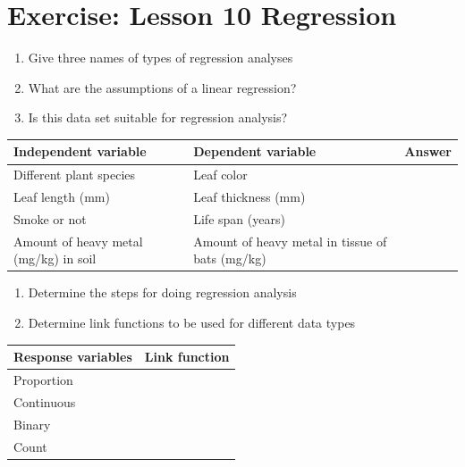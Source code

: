 \documentclass[
]{book}
\newcounter{none} %
\begin{document}
\section{Exercise: Lesson 10 Regression}\label{exercise-lesson-10-regression}

\begin{enumerate}
\def\labelenumi{\arabic{enumi}.}
\item
  Give three names of types of regression analyses
\item
  What are the assumptions of a linear regression?
\item
  Is this data set suitable for regression analysis?
\end{enumerate}

{\def\LTcaptype{none} %
\begin{longtable}[]{@{}
  >{\raggedright\arraybackslash}p{}
  >{\raggedright\arraybackslash}p{}
  >{\raggedright\arraybackslash}p{}@{}}
\toprule\noalign{}
\begin{minipage}[b]{\linewidth}\raggedright
Independent variable
\end{minipage} & \begin{minipage}[b]{\linewidth}\raggedright
Dependent variable
\end{minipage} & \begin{minipage}[b]{\linewidth}\raggedright
Answer
\end{minipage} \\
\midrule\noalign{}
\endhead
\bottomrule\noalign{}
\endlastfoot
Different plant species & Leaf color & \\
Leaf length (mm) & Leaf thickness (mm) & \\
Smoke or not & Life span (years) & \\
Amount of heavy metal (mg/kg) in soil & Amount of heavy metal in tissue of bats (mg/kg) & \\
\end{longtable}
}

\begin{enumerate}
\def\labelenumi{\arabic{enumi}.}
\setcounter{enumi}{3}
\item
  Determine the steps for doing regression analysis
\item
  Determine link functions to be used for different data types
\end{enumerate}

{\def\LTcaptype{none} %
\begin{longtable}[]{@{}ll@{}}
\toprule\noalign{}
Response variables & Link function \\
\midrule\noalign{}
\endhead
\bottomrule\noalign{}
\endlastfoot
Proportion & \\
Continuous & \\
Binary & \\
Count & \\
\end{longtable}
}
\end{document}
